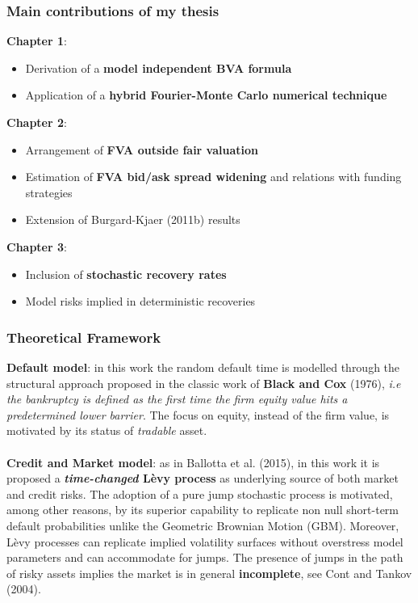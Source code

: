 \documentclass{beamer}
\begin{document}
\begin{frame}
\frametitle{Main contributions of my thesis}
\textbf{Chapter 1}:
\begin{itemize}
	\item Derivation of a \textbf{model independent BVA formula}
	\item Application of a \textbf{hybrid Fourier-Monte Carlo numerical technique}
\end{itemize}

\textbf{Chapter 2}:
\begin{itemize}
	\item Arrangement of \textbf{FVA outside fair valuation}
	\item Estimation of \textbf{FVA bid/ask spread widening} and relations with funding strategies
	\item Extension of Burgard-Kjaer (2011b) results
\end{itemize}

\textbf{Chapter 3}:
\begin{itemize}
	\item Inclusion of \textbf{stochastic recovery rates}
	\item Model risks implied in deterministic recoveries
\end{itemize}
\end{frame}

\begin{frame}
\frametitle{Theoretical Framework}

	\textbf{Default model}: in this work the random default time is modelled through the structural approach proposed in the classic work of \textbf{Black and Cox} (1976), \textit{i.e the bankruptcy is defined as the first time the firm equity value hits a predetermined lower barrier}.
	The focus on equity, instead of the firm value, is motivated by its status of \textit{tradable} asset. 
    \\~\\
	\textbf{Credit and Market model}: as in Ballotta et al. (2015), in this work it is proposed a \textbf{\emph{time-changed} Lèvy process} as underlying source of both market and credit risks. The adoption of a pure jump stochastic process is motivated, among other reasons, by its superior capability to replicate non null short-term default probabilities unlike the Geometric Brownian Motion (GBM). 	Moreover, Lèvy processes can replicate implied volatility surfaces without overstress model parameters and can accommodate for jumps. The presence of jumps in the path of risky assets implies the market is in general \textbf{incomplete}, see Cont and Tankov (2004).
\end{frame}
\end{document}
